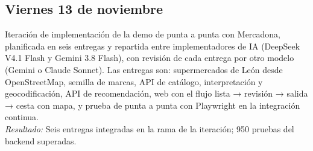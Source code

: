 \documentclass[11pt,a4paper]{article}
\newcommand{\actividad}[3]{\item[\textbf{[#1]}] #2 \\ \textit{Resultado:} #3}
\begin{document}
	\subsection*{Viernes 13 de noviembre}
	\begin{description}[leftmargin=0pt, itemsep=6pt]
		\actividad{Tarea}{Iteración de implementación de la demo de punta a punta con Mercadona, planificada en seis entregas y repartida entre implementadores de IA (DeepSeek V4.1 Flash y Gemini 3.8 Flash), con revisión de cada entrega por otro modelo (Gemini o Claude Sonnet). Las entregas son: supermercados de León desde OpenStreetMap, semilla de marcas, API de catálogo, interpretación y geocodificación, API de recomendación, web con el flujo lista → revisión → salida → cesta con mapa, y prueba de punta a punta con Playwright en la integración continua.}{Seis entregas integradas en la rama de la iteración; 950 pruebas del backend superadas.}
	\end{description}
\end{document}
